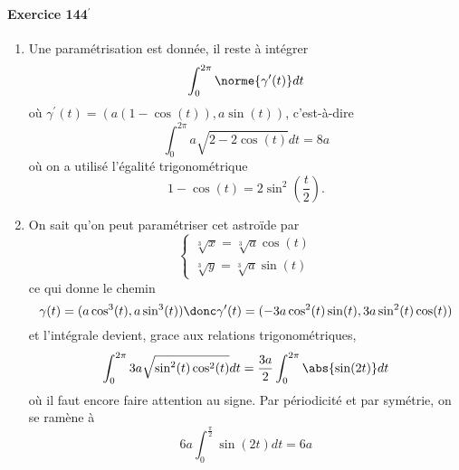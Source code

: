 \paragraph{Exercice 144$^\prime$}
\begin{enumerate}
\item Une paramétrisation est donnée, il reste à intégrer
\begin{equation*}
\int_0^{2\pi} \norme{\gamma^\prime(t)} d t
\end{equation*}
où $\gamma^\prime(t) = (a (1 - \cos(t)), a \sin(t))$, c'est-à-dire
\begin{equation*}
\int_0^{2\pi} a \sqrt{2 - 2 \cos(t)} d t = 8a
\end{equation*}
où on a utilisé l'égalité trigonométrique
\begin{equation*}
1 - \cos(t) = 2\sin^2\left(\frac t2\right).
\end{equation*}

\item On sait qu'on peut paramétriser cet astroïde par
\begin{equation*}
\begin{cases}
\sqrt[3]x = \sqrt[3]a \cos(t)\\
\sqrt[3]y = \sqrt[3]a \sin(t)
\end{cases}
\end{equation*}
ce qui donne le chemin
\begin{equation*}
\gamma(t) = (a \cos^3(t), a \sin^3(t)) \donc \gamma^\prime(t) = (-
3 a \cos^2(t) \sin(t), 3 a \sin^2(t) \cos(t))
\end{equation*}
et l'intégrale devient, grace aux relations trigonométriques,
\begin{equation*}
\int_0^{2\pi} 3 a \sqrt{\sin^2(t)\cos^2(t)} d t = \frac{3a}2 \int_0^{2\pi} \abs{\sin(2t)} d t
\end{equation*}
où il faut encore faire attention au signe. Par périodicité et par
symétrie, on se ramène à 
\begin{equation*}
6a \int_0^{\frac\pi2} \sin(2t) d t = 6 a
\end{equation*}


\end{enumerate}
